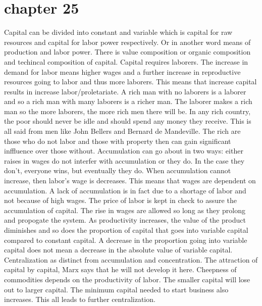 \documentclass{article}
\begin{document}
\section{chapter 25}
Capital can be divided into constant and variable which is capital for raw resources and capital for labor power respectively. Or in another word means of production and labor power. There is value composition or organic composition and techincal composition of capital. Capital requires laborers. The increase in demand for labor means higher wages and a further increase in reproductive resources going to labor and thus more laborers. This means that increase capital results in increase labor/proletariate. A rich man with no laborers is a laborer and so a rich man with many laborers is a richer man. The laborer makes a rich man so the more laborers, the more rich men there will be. In any rich country, the poor should never be idle and should spend any money they receive. This is all said from men like John Bellers and Bernard de Mandeville. The rich are those who do not labor and those with property then can gain significant inffluence over those without. Accumulation can go about in two ways: either raises in wages do not interfer with accumulation or they do. In the case they don't, everyone wins, but eventually they do. When accumulation cannot increase, then labor's wage is decreases. This means that wages are dependent on accumulation. A lack of accumulation is in fact due to a shortage of labor and not because of high wages. The price of labor is kept in check to assure the accumulation of capital. The rise in wages are allowed so long as they prolong and propogate the system. As productivity increases, the value of the product diminishes and so does the proportion of capital that goes into variable capital compared to constant capital. A decrease in the proportion going into variable capital does not mean a decrease in the absolute value of variable capital. 
Centralization as distinct from accumulation and concentration. The attraction of capital by capital, Marx says that he will not develop it here. Cheepness of commodities depends on the productivity of labor. The smaller capital will lose out to larger capital. The minimum capital needed to start business also increases. This all leads to further centralization. 
\end{document}
